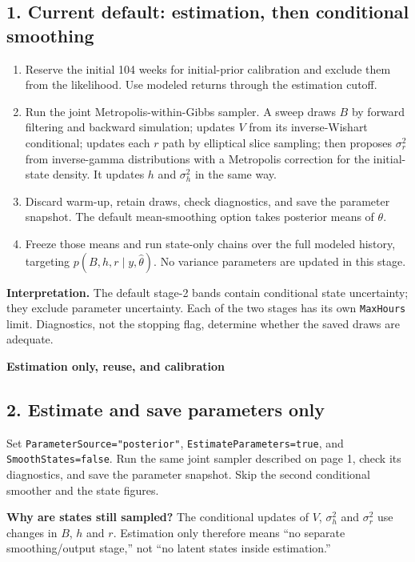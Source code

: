 \documentclass[10pt,a4paper]{article}
\newcommand{\code}[1]{\texttt{#1}}
\begin{document}
\subsection*{1. Current default: estimation, then conditional smoothing}
\begin{enumerate}
\item Reserve the initial 104 weeks for initial-prior calibration and exclude
them from the likelihood. Use modeled returns through the estimation cutoff.
\item Run the joint Metropolis-within-Gibbs sampler. A sweep draws $B$ by forward filtering and
backward simulation; updates $V$ from its inverse-Wishart conditional; updates
each $r$ path by elliptical slice sampling; then proposes $\sigma_r^2$ from
inverse-gamma distributions with a Metropolis correction for the initial-state
density. It updates $h$ and $\sigma_h^2$ in the same way.
\item Discard warm-up, retain draws, check diagnostics, and save the parameter
snapshot. The default mean-smoothing option takes posterior means of $\theta$.
\item Freeze those means and run state-only chains over the full modeled
history, targeting $p(B,h,r\mid y,\widehat\theta)$. No variance parameters are
updated in this stage.
\end{enumerate}
\textbf{Interpretation.} The default stage-2 bands contain conditional state
uncertainty; they exclude parameter uncertainty. Each of the two stages has
its own \code{MaxHours} limit. Diagnostics, not the stopping flag, determine
whether the saved draws are adequate.

\clearpage
{\color{ink}\Large\bfseries Estimation only, reuse, and calibration\par}
\subsection*{2. Estimate and save parameters only}
Set \code{ParameterSource="posterior"}, \code{EstimateParameters=true}, and
\code{SmoothStates=false}. Run the same joint sampler described on page 1,
check its diagnostics, and save the parameter snapshot. Skip the second
conditional smoother and the state figures.

\textbf{Why are states still sampled?} The conditional updates of $V$,
$\sigma_h^2$ and $\sigma_r^2$ use changes in $B$, $h$ and $r$. Estimation only
therefore means ``no separate smoothing/output stage,'' not ``no latent states
inside estimation.''
\end{document}
